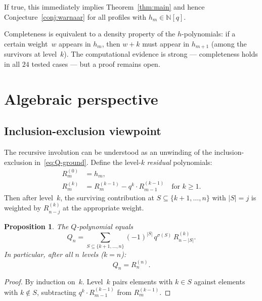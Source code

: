 \documentclass[11pt]{article}
\newcommand{\N}{\mathbb{N}}
\theoremstyle{plain}
\newtheorem{proposition}[theorem]{Proposition}
\theoremstyle{definition}
\begin{document}
If true, this immediately implies
Theorem~\ref{thm:main} and hence
Conjecture~\ref{conj:warnaar} for all profiles with
$h_m \in \N[q]$.

Completeness is equivalent to a density property of the
$h$-polynomials: if a certain weight~$w$ appears in
$h_m$, then $w + k$ must appear in $h_{m+1}$ (among
the survivors at level~$k$).  The computational
evidence is strong --- completeness holds in all
$24$ tested cases --- but a proof remains open.


\section{Algebraic perspective}
\label{sec:algebraic}


\subsection{Inclusion-exclusion viewpoint}

The recursive involution can be understood as an
unwinding of the inclusion-exclusion
in~\eqref{eq:Q-ground}.  Define the level-$k$
\emph{residual} polynomials:
\begin{align}
  R_m^{(0)} &= h_m, \label{eq:R0} \\
  R_m^{(k)} &= R_m^{(k-1)} - q^k \cdot R_{m-1}^{(k-1)}
    \quad\text{for } k \geq 1. \label{eq:Rk}
\end{align}
Then after level~$k$, the surviving contribution at
$S \subseteq \{k+1, \ldots, n\}$ with $|S| = j$ is
weighted by $R_{n-j}^{(k)}$ at the appropriate weight.

\begin{proposition}
\label{prop:residual}
The $Q$-polynomial equals
\begin{equation}\label{eq:Q-residual}
  Q_n = \sum_{S \subseteq \{k+1, \ldots, n\}}
    (-1)^{|S|}\, q^{\sigma(S)}\, R_{n-|S|}^{(k)}.
\end{equation}
In particular, after all $n$ levels ($k = n$):
\begin{equation}\label{eq:Q-final}
  Q_n = R_n^{(n)}.
\end{equation}
\end{proposition}

\begin{proof}
By induction on~$k$.  Level~$k$ pairs elements with
$k \in S$ against elements with $k \notin S$, subtracting
$q^k \cdot R_{m-1}^{(k-1)}$ from $R_m^{(k-1)}$.
\end{proof}
\end{document}
